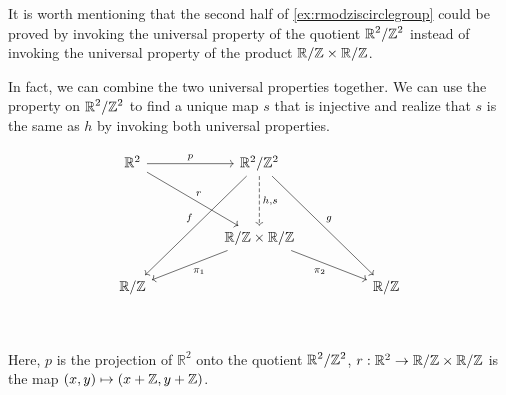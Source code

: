 \documentclass{article}
\begin{document}
\begin{remark} 
  It is worth mentioning that the second half of \ref{ex:rmodziscirclegroup}
  could be proved by invoking the universal property of the quotient \({{\displaystyle \mathbb{R}^{2}}}/{{\displaystyle \mathbb{Z}^{2}}}\)
  instead of invoking the universal property of the product \({{\displaystyle \mathbb{R}}}/{{\displaystyle \mathbb{Z}}}\times {{\displaystyle \mathbb{R}}}/{{\displaystyle \mathbb{Z}}}\).

  In fact, we can combine the two universal properties together. We can use 
  the property on \({{\displaystyle \mathbb{R}^{2}}}/{{\displaystyle \mathbb{Z}^{2}}}\) to find a unique map \(s\) that 
  is injective and realize that \(s\) is the same as \(h\) by invoking 
  both universal properties.


  \[\begin{tikzcd}
    {\mathbb{R}^{2}} && {\mathbb{R}^{2}/\mathbb{Z}^{2}} && \\
    \\
    && {\mathbb{R}/\mathbb{Z} \times \mathbb{R}/\mathbb{Z}} \\
    {\mathbb{R}/\mathbb{Z}} &&&& {\mathbb{R}/\mathbb{Z}} \\
    \arrow["p", from=1-1, to=1-3]
    \arrow["r", from=1-1, to=3-3]
    \arrow["{h,s}", dashed, from=1-3, to=3-3]
    \arrow["f"', from=1-3, to=4-1]
    \arrow["g", from=1-3, to=4-5]
    \arrow["{\pi_1}", from=3-3, to=4-1]
    \arrow["{\pi_2}"', from=3-3, to=4-5]
  \end{tikzcd}\]
  
  Here, \(p\) is the projection of \(\mathbb{R}^{2}\) onto the quotient \({{\displaystyle \mathbb{R}^{2}}}/{{\displaystyle \mathbb{Z}^{2}}}\),
  \(r:\mathbb{R}^{2}\to {{\displaystyle \mathbb{R}}}/{{\displaystyle \mathbb{Z}}} \times {{\displaystyle \mathbb{R}}}/{{\displaystyle \mathbb{Z}}}\) is the map 
  \((x,y)\mapsto (x+\mathbb{Z}, y+\mathbb{Z})\).
  
\end{remark}
\end{document}
